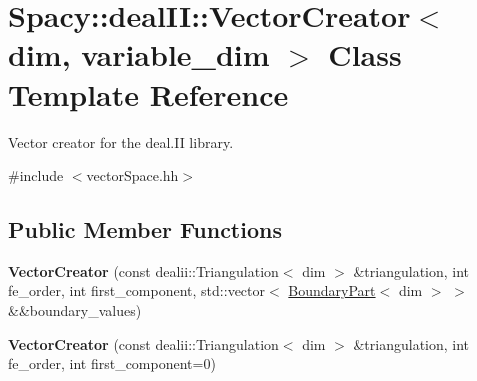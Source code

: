 \hypertarget{classSpacy_1_1dealII_1_1VectorCreator}{\section{Spacy\-:\-:deal\-I\-I\-:\-:Vector\-Creator$<$ dim, variable\-\_\-dim $>$ Class Template Reference}
\label{classSpacy_1_1dealII_1_1VectorCreator}
}


Vector creator for the deal.\-I\-I library.  




{\ttfamily \#include $<$vector\-Space.\-hh$>$}

\subsection*{Public Member Functions}
\begin{DoxyCompactItemize}
\item 
\hypertarget{classSpacy_1_1dealII_1_1VectorCreator_acdbdf15ebaa767034a45e611c848e24e}{{\bfseries Vector\-Creator} (const dealii\-::\-Triangulation$<$ dim $>$ \&triangulation, int fe\-\_\-order, int first\-\_\-component, std\-::vector$<$ \hyperlink{structSpacy_1_1dealII_1_1BoundaryPart}{Boundary\-Part}$<$ dim $>$ $>$ \&\&boundary\-\_\-values)}\label{classSpacy_1_1dealII_1_1VectorCreator_acdbdf15ebaa767034a45e611c848e24e}

\item 
\hypertarget{classSpacy_1_1dealII_1_1VectorCreator_ae5996e34a144dd1accdab9822f2564b1}{{\bfseries Vector\-Creator} (const dealii\-::\-Triangulation$<$ dim $>$ \&triangulation, int fe\-\_\-order, int first\-\_\-component=0)}\label{classSpacy_1_1dealII_1_1VectorCreator_ae5996e34a144dd1accdab9822f2564b1}

\end{DoxyCompactItemize}
